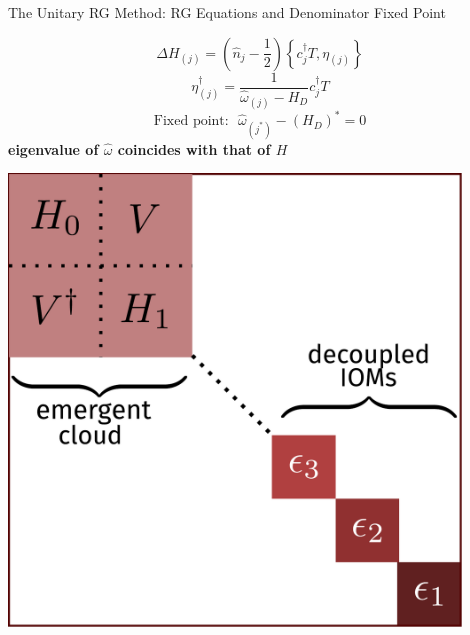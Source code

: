 \documentclass[10pt,aspectratio=169]{beamer}
\newcommand{\focus}[1]{\textcolor{lblue}{\textbf{#1}}}
\begin{document}
\begin{frame}[noframenumbering]{The Unitary RG Method: RG Equations and Denominator Fixed Point}

\begin{minipage}{0.55\textwidth}
	\centering
\[ \Delta H_{(j)} = \left(\hat n_j - \frac{1}{2}\right) \left\{c^\dagger_j T, \eta_{(j)}\right\} \]
\[\eta^\dagger_{(j)} = \frac{1}{\hat \omega_{(j)} - H_D}c^\dagger_j T\] 
\[\text{{Fixed point:}}~ ~ ~\hat \omega_{(j^*)} - \left(H_D\right)^* = 0\]
\focus{eigenvalue of \(\hat \omega\) coincides with that of \(H\)}
\end{minipage}
\hspace*{\fill}
\begin{minipage}{0.4\textwidth}
	\centering
	\includegraphics[width=0.9\textwidth]{figures/urg_ham_full.pdf}
\end{minipage}
\vspace*{\fill}
\end{frame}
\end{document}
